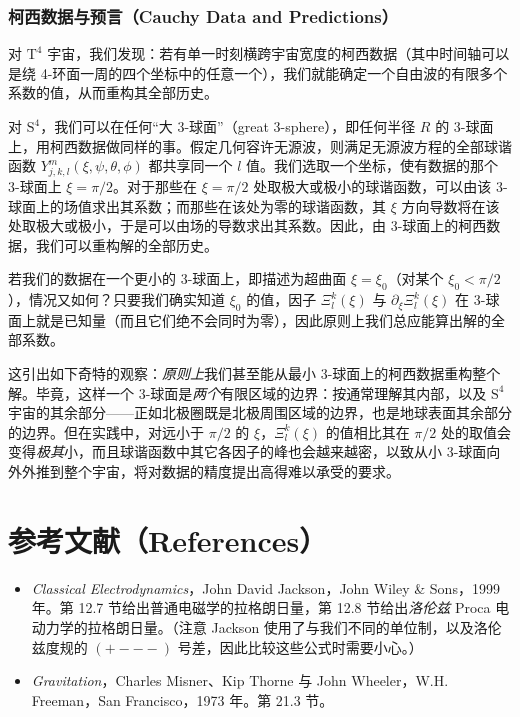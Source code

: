 \subsubsection{柯西数据与预言（Cauchy Data and Predictions）}

对 $\text{T}^{4}$ 宇宙，我们发现：若有单一时刻横跨宇宙宽度的柯西数据（其中时间轴可以是绕 4-环面一周的四个坐标中的任意一个），我们就能确定一个自由波的有限多个系数的值，从而重构其全部历史。

对 $\text{S}^{4}$，我们可以在任何“大 3-球面”（great 3-sphere），即任何半径 $R$ 的 3-球面上，用柯西数据做同样的事。假定几何容许无源波，则满足无源波方程的全部球谐函数 $Y^{m}_{j,k,l}(\xi,\psi,\theta,\phi)$ 都共享同一个 $l$ 值。我们选取一个坐标，使有数据的那个 3-球面上 $\xi=\pi/2$。对于那些在 $\xi=\pi/2$ 处取极大或极小的球谐函数，可以由该 3-球面上的场值求出其系数；而那些在该处为零的球谐函数，其 $\xi$ 方向导数将在该处取极大或极小，于是可以由场的导数求出其系数。因此，由 3-球面上的柯西数据，我们可以重构解的全部历史。

若我们的数据在一个更小的 3-球面上，即描述为超曲面 $\xi=\xi_{0}$（对某个 $\xi_{0}<\pi/2$），情况又如何？只要我们确实知道 $\xi_{0}$ 的值，因子 $\Xi^{k}_{l}(\xi)$ 与 $\partial_{\xi}\Xi^{k}_{l}(\xi)$ 在 3-球面上就是已知量（而且它们绝不会同时为零），因此原则上我们总应能算出解的全部系数。

这引出如下奇特的观察：\emph{原则上}我们甚至能从最小 3-球面上的柯西数据重构整个解。毕竟，这样一个 3-球面是\emph{两个}有限区域的边界：按通常理解其内部，以及 $\text{S}^{4}$ 宇宙的其余部分——正如北极圈既是北极周围区域的边界，也是地球表面其余部分的边界。但在实践中，对远小于 $\pi/2$ 的 $\xi$，$\Xi^{k}_{l}(\xi)$ 的值相比其在 $\pi/2$ 处的取值会变得\emph{极其}小，而且球谐函数中其它各因子的峰也会越来越密，以致从小 3-球面向外外推到整个宇宙，将对数据的精度提出高得难以承受的要求。

\section{参考文献（References）}

\begin{itemize}
  \item[{[1]}] \emph{Classical Electrodynamics}，John David Jackson，John Wiley \& Sons，1999 年。第 12.7 节给出普通电磁学的拉格朗日量，第 12.8 节给出\emph{洛伦兹} Proca 电动力学的拉格朗日量。（注意 Jackson 使用了与我们不同的单位制，以及洛伦兹度规的 $(+---)$ 号差，因此比较这些公式时需要小心。）
  \item[{[2]}] \emph{Gravitation}，Charles Misner、Kip Thorne 与 John Wheeler，W.H. Freeman，San Francisco，1973 年。第 21.3 节。
\end{itemize}
